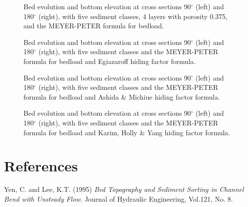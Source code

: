 \begin{figure} [!h]
\centering
{}
\caption{Bed evolution and bottom elevation at cross sections 90$^{\circ}$ (left) and 180$^{\circ}$ (right), with five sediment classes, 4 layers with porosity 0.375, and the MEYER-PETER formula for bedload.}\label{fig:results_multi9}
\end{figure}
\begin{figure} [!h]
\centering
{}
\caption{Bed evolution and bottom elevation at cross sections 90$^{\circ}$ (left) and 180$^{\circ}$ (right), with five sediment classes and the MEYER-PETER formula for bedload and Egiazaroff hiding factor formula.}\label{fig:results_multi1_hid1}
\end{figure}
\begin{figure} [!h]
\centering
{}
\caption{Bed evolution and bottom elevation at cross sections 90$^{\circ}$ (left) and 180$^{\circ}$ (right), with five sediment classes and the MEYER-PETER formula for bedload and Ashida \& Michiue hiding factor formula.}\label{fig:results_multi1_hid2}
\end{figure}
\begin{figure} [!h]
\centering
{}
\caption{Bed evolution and bottom elevation at cross sections 90$^{\circ}$ (left) and 180$^{\circ}$ (right), with five sediment classes and the MEYER-PETER formula for bedload and Karim, Holly \& Yang hiding factor formula.}\label{fig:results_multi1_hid4}
\end{figure}


\section{References}
%
Yen, C. and Lee, K.T. (1995) \textit{ Bed Topography and Sediment Sorting in Channel Bend
with Unsteady Flow}. Journal of Hydraulic Engineering, Vol.121, No. 8.
